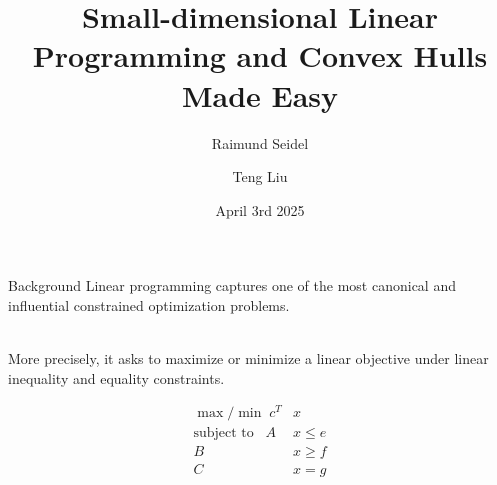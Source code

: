\documentclass{beamer}
\title[Seminar Geometry: Combinatorics and Algorithms FS25] %
{Small-dimensional Linear Programming and Convex Hulls Made Easy}
\subtitle{Raimund Seidel}
\author[Teng Liu] %
{Teng Liu}
\date[]{April 3rd 2025}
\begin{document}
\frame{\titlepage}

\begin{frame}{Background}
	Linear programming captures one of the most canonical and influential constrained optimization problems. \\~\

	More precisely, it asks to maximize or minimize a linear objective under linear
	inequality and equality constraints.


	\begin{align*}
		\max / \min \; c^T         & x       \\
		\text{subject to} \;\;\; A & x \le e \\
		B                          & x \ge f \\
		C                          & x = g
	\end{align*}


\end{frame}
\end{document}

